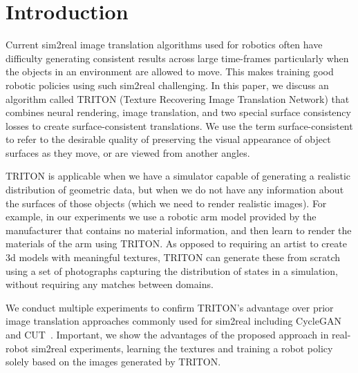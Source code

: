 \documentclass{article}
\begin{document}
\section{Introduction}

    



Current sim2real image translation algorithms used for robotics \cite{retina_gan,rl_cyclegan} often have difficulty generating consistent results across large time-frames particularly when the objects in an environment are allowed to move. This makes training good robotic policies using such sim2real challenging.
In this paper, we discuss an algorithm called TRITON (Texture Recovering Image Translation Network) that combines neural rendering, image translation, and two special surface consistency losses to create surface-consistent translations.
We use the term surface-consistent to refer to the desirable quality of preserving the visual appearance of object surfaces as they move, or are viewed from another angles. 

TRITON is applicable when we have a simulator capable of generating a realistic distribution of geometric data, but when we do not have any information about the surfaces of those objects (which we need to render realistic images). For example, in our experiments we use a robotic arm model provided by the manufacturer that contains no material information, and then learn to render the materials of the arm using TRITON.
As opposed to requiring an artist to create 3d models with meaningful textures, TRITON can generate these from scratch using a set of photographs capturing the distribution of states in a simulation, without requiring any matches between domains. 

We conduct multiple experiments to confirm TRITON's advantage over prior image translation approaches commonly used for sim2real including CycleGAN~\cite{cyclegan} and CUT~\cite{cut}.
Important, we show the advantages of the proposed approach in real-robot sim2real experiments, learning the textures and training a robot policy solely based on the images generated by TRITON. 
\end{document}
